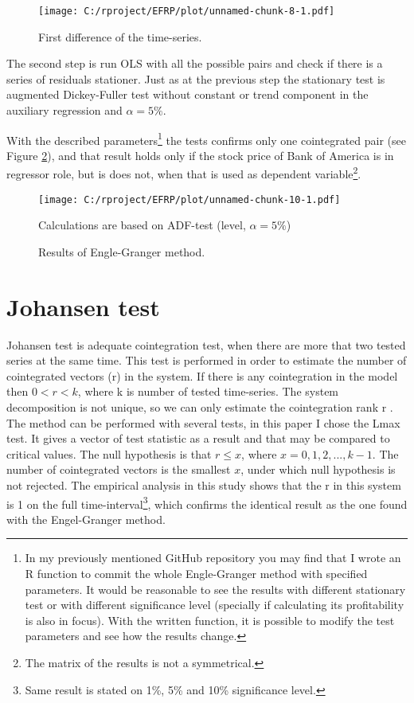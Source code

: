 \documentclass[12pt, a4paper, twoside, titlepage]{article}
\begin{document}
\begin{figure}[ht]
  \centering
  \texttt{[image: C:/rproject/EFRP/plot/unnamed-chunk-8-1.pdf]}
  \caption{First difference of the time-series.}
  \label{fig3}
\end{figure}

The second step is run OLS with all the possible pairs and check if there is a series of residuals stationer. Just as at the previous step the stationary test is augmented Dickey-Fuller test without constant or trend component in the auxiliary regression and $\alpha = 5\%$.

With the described parameters\footnote{In my previously mentioned GitHub repository you may find that I wrote an R function to commit the whole Engle-Granger method with specified parameters. It would be reasonable to see the results with different stationary test or with different significance level (specially if calculating its profitability is also in focus). With the written function, it is possible to modify the test parameters and see how the results change.} the tests confirms only one cointegrated pair (see Figure \ref{fig4}), and that result holds only if the stock price of Bank of America is in regressor role, but is does not, when that is used as dependent variable\footnote{The matrix of the results is not a symmetrical.}.

\begin{figure}[ht]
  \centering
  \texttt{[image: C:/rproject/EFRP/plot/unnamed-chunk-10-1.pdf]}
  \caption{Results of Engle-Granger method.}
  \label{fig4}
  Calculations are based on ADF-test (level, $\alpha = 5\%$)
\end{figure}

\section{Johansen test}

Johansen test is adequate cointegration test, when there are more that two tested series at the same time. This test is performed in order to estimate the number of cointegrated vectors (r) in the system. If there is any cointegration in the model then $0<r<k$, where k is number of tested time-series. The system decomposition is not unique, so we can only estimate the cointegration rank r \cite{Kirchgassner.2007}.
The method can be performed with several tests, in this paper I chose the Lmax test. It gives a vector of test statistic as a result and that may be compared to critical values. The null hypothesis is that $r \leq x$, where $x = 0, 1, 2, ..., k-1$. The number of cointegrated vectors is the smallest $x$, under which null hypothesis is not rejected. The empirical analysis in this study shows that the r in this system is 1 on the full time-interval\footnote{Same result is stated on 1\%, 5\% and 10\% significance level.}, which confirms the identical result as the one found with the Engel-Granger method.
\end{document}
